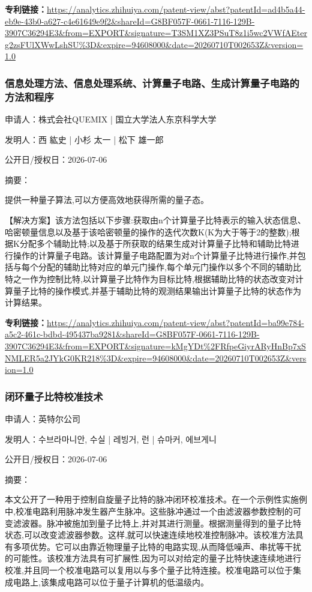 \documentclass[12pt,a4paper]{ctexart}
\begin{document}
\noindent\textbf{专利链接：}\url{https://analytics.zhihuiya.com/patent-view/abst?patentId=ad4b5a44-eb9e-43b0-a627-c4e61649e9f2&shareId=G8BF057F-0661-7116-129B-3907C36294E3&from=EXPORT&signature=T3SM1XZ3PSuT8z1i5wc2VWfAEterg2zsFUlXWwLshSU%3D&expire=94608000&date=20260710T002653Z&version=1.0}

\subsubsection{ 信息处理方法、信息处理系统、计算量子电路、生成计算量子电路的方法和程序 }

申请人：株式会社QUEMIX | 国立大学法人东京科学大学

发明人：西 紘史 | 小杉 太一 | 松下 雄一郎

公开日/授权日：2026-07-06

摘要：

提供一种量子算法,可以方便高效地获得所需的量子态。 

 【解决方案】该方法包括以下步骤:获取由n个计算量子比特表示的输入状态信息、哈密顿量信息以及基于该哈密顿量的操作的迭代次数K(K为大于等于2的整数);根据K分配多个辅助比特;以及基于所获取的结果生成对计算量子比特和辅助比特进行操作的计算量子电路。该计算量子电路配置为对n个计算量子比特进行操作,并包括与每个分配的辅助比特对应的单元门操作,每个单元门操作以多个不同的辅助比特之一作为控制比特,以计算量子比特作为目标比特,根据辅助比特的状态改变对计算量子比特的操作模式,并基于辅助比特的观测结果输出计算量子比特的状态作为计算结果。

\noindent\textbf{专利链接：}\url{https://analytics.zhihuiya.com/patent-view/abst?patentId=ba99e784-a5c2-461c-bdbd-495437ba9281&shareId=G8BF057F-0661-7116-129B-3907C36294E3&from=EXPORT&signature=kMgYDt%2FRfpeGiyrARyHnBp7xSNMLER5a2JYkG0KR218%3D&expire=94608000&date=20260710T002653Z&version=1.0}

\subsubsection{ 闭环量子比特校准技术 }

申请人：英特尔公司

发明人：수브라마니안, 수실 | 레빙거, 런 | 슈마커, 에브게니

公开日/授权日：2026-07-06

摘要：

本文公开了一种用于控制自旋量子比特的脉冲闭环校准技术。在一个示例性实施例中,校准电路利用脉冲发生器产生脉冲。这些脉冲通过一个由滤波器参数控制的可变滤波器。脉冲被施加到量子比特上,并对其进行测量。根据测量得到的量子比特状态,可以改变滤波器参数。这样,​​就可以快速连续地校准控制脉冲。该校准方法具有多项优势。它可以由靠近物理量子比特的电路实现,从而降低噪声、串扰等干扰的可能性。该校准方法具有可扩展性,因为可以对给定的量子比特快速连续地进行校准,并且同一个校准电路可以复用以与多个量子比特连接。校准电路可以位于集成电路上,该集成电路可以位于量子计算机的低温级内。
\end{document}
